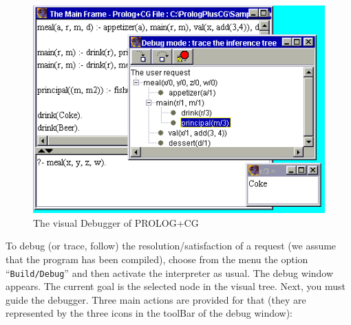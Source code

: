 \documentclass{book}
\begin{document}
\begin{htmlonly}

\begin{figure}
\begin{center}
\includegraphics{Debug.png}
\end{center}
\caption{\label{Debug}The visual Debugger of PROLOG+CG}
\end{figure}

\end{htmlonly}



To debug (or trace, follow) the resolution/satisfaction of a request
(we assume that the program has been compiled), choose from the menu
the option ``\texttt{Build/Debug}'' and then activate the interpreter
as usual. The debug window appears. The current goal is the selected
node in the visual tree. Next, you must guide the debugger. Three main
actions are provided for that (they are represented by the three icons
in the toolBar of the debug window):
\end{document}
